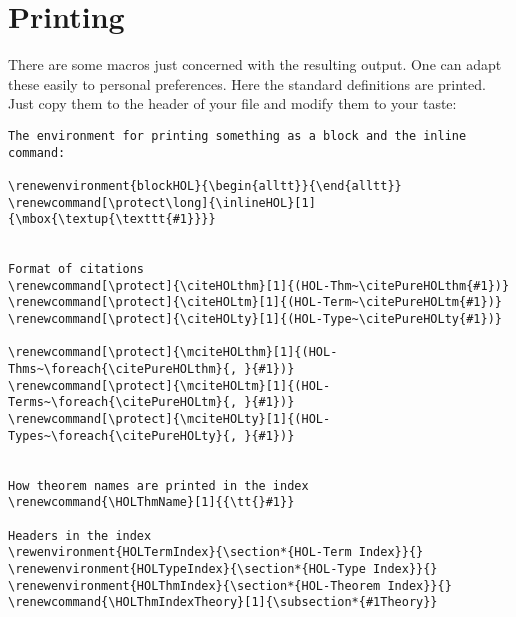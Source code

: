 \documentclass{article}
\begin{document}
\section{Printing}
There are some macros just concerned with the resulting output.
One can adapt these easily to personal preferences. Here the standard
definitions are printed. Just copy them to the header of your file
and modify them to your taste:

\begin{verbatim}
The environment for printing something as a block and the inline command:

\renewenvironment{blockHOL}{\begin{alltt}}{\end{alltt}}
\renewcommand[\protect\long]{\inlineHOL}[1]{\mbox{\textup{\texttt{#1}}}}


Format of citations
\renewcommand[\protect]{\citeHOLthm}[1]{(HOL-Thm~\citePureHOLthm{#1})}
\renewcommand[\protect]{\citeHOLtm}[1]{(HOL-Term~\citePureHOLtm{#1})}
\renewcommand[\protect]{\citeHOLty}[1]{(HOL-Type~\citePureHOLty{#1})}

\renewcommand[\protect]{\mciteHOLthm}[1]{(HOL-Thms~\foreach{\citePureHOLthm}{, }{#1})}
\renewcommand[\protect]{\mciteHOLtm}[1]{(HOL-Terms~\foreach{\citePureHOLtm}{, }{#1})}
\renewcommand[\protect]{\mciteHOLty}[1]{(HOL-Types~\foreach{\citePureHOLty}{, }{#1})}


How theorem names are printed in the index
\renewcommand{\HOLThmName}[1]{{\tt{}#1}}

Headers in the index
\rewenvironment{HOLTermIndex}{\section*{HOL-Term Index}}{}
\renewenvironment{HOLTypeIndex}{\section*{HOL-Type Index}}{}
\renewenvironment{HOLThmIndex}{\section*{HOL-Theorem Index}}{}
\renewcommand{\HOLThmIndexTheory}[1]{\subsection*{#1Theory}}



\end{verbatim}
\end{document}
